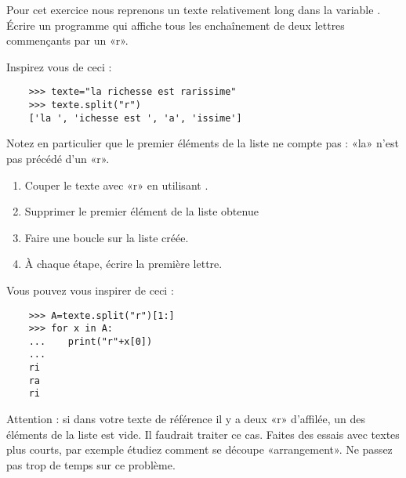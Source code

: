 
\begin{exercice}\label{exoPremiere-0054}

    Pour cet exercice nous reprenons un texte relativement long dans la variable . Écrire un programme qui affiche tous les enchaînement de deux lettres commençants par un «r».

    Inspirez vous de ceci :
    \begin{verbatim}
    >>> texte="la richesse est rarissime"
    >>> texte.split("r")
    ['la ', 'ichesse est ', 'a', 'issime']
    \end{verbatim}

    Notez en particulier que le premier éléments de la liste ne compte pas : «la» n'est pas précédé d'un «r».
    \begin{enumerate}
        \item
            Couper le texte avec «r» en utilisant .
        \item
            Supprimer le premier élément de la liste obtenue
        \item
            Faire une boucle  sur la liste créée.
        \item
            À chaque étape, écrire la première lettre.
    \end{enumerate}

    Vous pouvez vous inspirer de ceci :
    \begin{verbatim}
    >>> A=texte.split("r")[1:]
    >>> for x in A:
    ...    print("r"+x[0])
    ... 
    ri
    ra
    ri
    \end{verbatim}

    Attention : si dans votre texte de référence il y a deux «r» d'affilée, un des éléments de la liste est vide. Il faudrait traiter ce cas. Faites des essais avec textes plus courts, par exemple étudiez comment se découpe «arrangement». Ne passez pas trop de temps sur ce problème.

\end{exercice}
